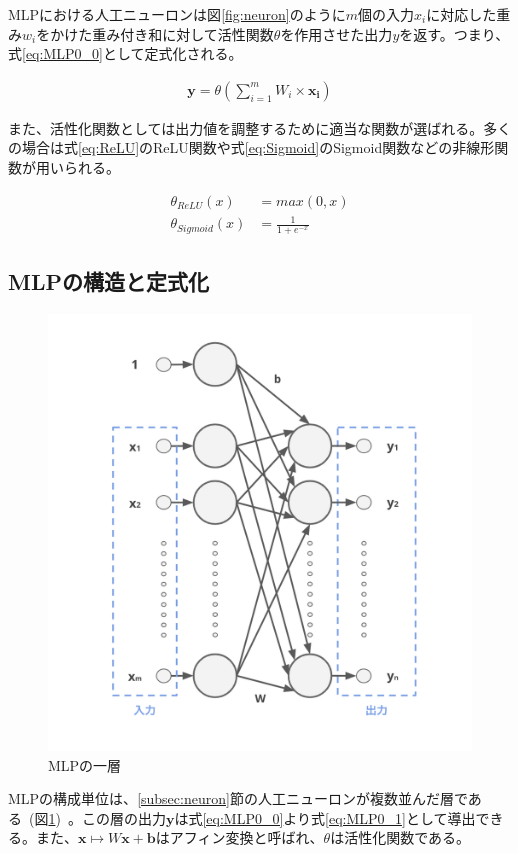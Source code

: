 MLPにおける人工ニューロンは図\ref{fig:neuron}のように$m$個の入力$x_i$に対応した重み$w_i$をかけた重み付き和に対して活性関数$\theta$を作用させた出力$y$を返す。つまり、式\ref{eq:MLP0_0}として定式化される。

\begin{align}
    \label{eq:MLP0_0}
    \boldsymbol{y}=\theta(\sum_{i=1}^{m} W_{i} \times \boldsymbol{x_i})
\end{align}

また、活性化関数としては出力値を調整するために適当な関数が選ばれる。多くの場合は式\ref{eq:ReLU}のReLU関数や式\ref{eq:Sigmoid}のSigmoid関数などの非線形関数が用いられる。

\begin{align}
    \label{eq:ReLU}
    \theta_{ReLU}(x)&=max(0,x)\\
    \label{eq:Sigmoid}
    \theta_{Sigmoid}(x)&=\frac{1}{1+e^{-x}}
\end{align}

\subsection{MLPの構造と定式化}

\begin{figure}[b]
\begin{center}
\includegraphics[width=0.6\hsize]{figure/mlp_net0.png}
\caption{MLPの一層}
\label{fig:MLP_net0}
\end{center}
\end{figure}

MLPの構成単位は、\ref{subsec:neuron}節の人工ニューロンが複数並んだ層である~(図\ref{fig:MLP_net0})~。この層の出力$\boldsymbol{y}$は式\ref{eq:MLP0_0}より式\ref{eq:MLP0_1}として導出できる。また、$\boldsymbol{x} \mapsto W\boldsymbol{x}+\boldsymbol{b}$はアフィン変換と呼ばれ、$\theta$は活性化関数である。

